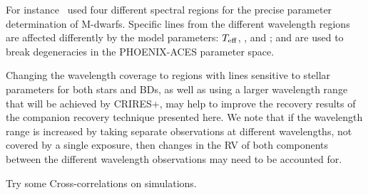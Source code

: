 For instance~\citet{passegger_fundamental_2016} used four different spectral regions for the precise parameter determination of M-dwarfs. Specific lines from the different wavelength regions are affected differently by the model parameters: \(T_{\mathrm{eff}}{}\), \logg{}, and \feh{}; and are used to break degeneracies in the {PHOENIX-ACES} parameter space.

Changing the wavelength coverage to regions with lines sensitive to stellar parameters for both stars and BDs, as well as using a larger wavelength range that will be achieved by {CRIRES+}, may help to improve the recovery results of the companion recovery technique presented here. We note that if the wavelength range is increased by taking separate observations at different wavelengths, not covered by a single exposure, then changes in the {RV} of both components between the different wavelength observations may need to be accounted for.







Try some Cross-correlations on simulations.


